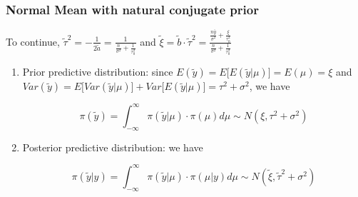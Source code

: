 \documentclass{beamer}
\begin{document}

\begin{frame}
\frametitle{Normal Mean with natural conjugate prior}

To continue, $\tilde \tau^2 = -\frac{1}{2 \tilde a} = \frac{1}{\frac{n}{\sigma^2}+\frac{1}{\tau_0^2}}$ and $\tilde \xi = \tilde b \cdot \tilde \tau^2 = \frac{\frac{n \bar y}{\sigma^2}+\frac{\xi}{\tau_0^2}}{\frac{n}{\sigma^2}+\frac{1}{\tau_0^2}}$

\begin{enumerate}
\item Prior predictive distribution: since $E(\tilde y) = E\Big[E(\tilde y|\mu)\Big] = E(\mu) = \xi$ and $Var(\tilde y) = E\Big[Var(\tilde y|\mu)\Big] + Var\Big[E(\tilde y|\mu)\Big] = \tau^2 + \sigma^2$, we have

$$\pi(\tilde y) = \int_{-\infty}^{\infty} \pi(\tilde y|\mu) \cdot \pi(\mu)d\mu \sim N(\xi, \tau^2 + \sigma^2)$$

\item Posterior predictive distribution: we have

$$\pi(\tilde y|y) = \int_{-\infty}^{\infty} \pi(\tilde y|\mu) \cdot \pi(\mu|y)d\mu \sim N(\tilde \xi, \tilde \tau^2 + \sigma^2)$$

\end{enumerate}

\end{frame}

\end{document}
